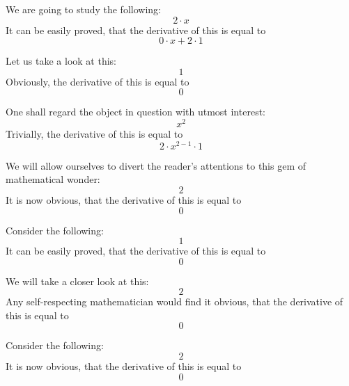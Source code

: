 \documentclass{article}
\begin{document}
We are going to study the following:
\begin{equation}
2 \cdot x 
\end{equation}
It can be easily proved, that the derivative of this is equal to
\begin{equation}
0 \cdot x + 2 \cdot 1 
\end{equation}

Let us take a look at this:
\begin{equation}
1 
\end{equation}
Obviously, the derivative of this is equal to
\begin{equation}
0 
\end{equation}

One shall regard the object in question with utmost interest:
\begin{equation}
x ^{2 } 
\end{equation}
Trivially, the derivative of this is equal to
\begin{equation}
2 \cdot x ^{2 - 1 } \cdot 1 
\end{equation}

We will allow ourselves to divert the reader's attentions to this gem of mathematical wonder:
\begin{equation}
2 
\end{equation}
It is now obvious, that the derivative of this is equal to
\begin{equation}
0 
\end{equation}

Consider the following:
\begin{equation}
1 
\end{equation}
It can be easily proved, that the derivative of this is equal to
\begin{equation}
0 
\end{equation}

We will take a closer look at this:
\begin{equation}
2 
\end{equation}
Any self-respecting mathematician would find it obvious, that the derivative of this is equal to
\begin{equation}
0 
\end{equation}

Consider the following:
\begin{equation}
2 
\end{equation}
It is now obvious, that the derivative of this is equal to
\begin{equation}
0 
\end{equation}
\end{document}

